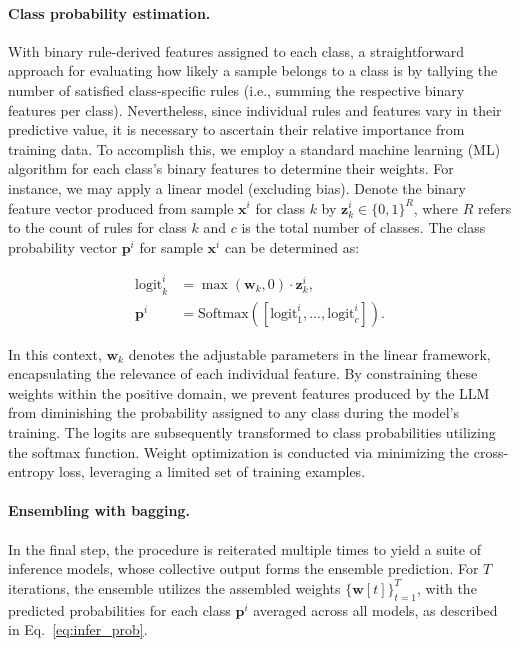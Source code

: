 \paragraph{Class probability estimation.} With binary rule-derived features assigned to each class, a straightforward approach for evaluating how likely a sample belongs to a class is by tallying the number of satisfied class-specific rules (i.e., summing the respective binary features per class). Nevertheless, since individual rules and features vary in their predictive value, it is necessary to ascertain their relative importance from training data. To accomplish this, we employ a standard machine learning (ML) algorithm for each class’s binary features to determine their weights. For instance, we may apply a linear model (excluding bias). Denote the binary feature vector produced from sample $\mathbf{x}^i$ for class $k$ by $\mathbf{z}_k^i \in \{0, 1\}^R$, where $R$ refers to the count of rules for class $k$ and $c$ is the total number of classes. The class probability vector $\mathbf{p}^i$ for sample $\mathbf{x}^i$ can be determined as:

\begin{align}
\text{logit}_k^i &= \max(\mathbf{w}_k, 0) \cdot \mathbf{z}_k^i, \nonumber \\
\mathbf{p}^i &= \text{Softmax}({[\text{logit}_{1}^i, ..., \text{logit}_{c}^i]}). \label{eq:infer_prob}
\end{align}

In this context, $\mathbf{w}_k$ denotes the adjustable parameters in the linear framework, encapsulating the relevance of each individual feature. By constraining these weights within the positive domain, we prevent features produced by the LLM from diminishing the probability assigned to any class during the model's training. The logits are subsequently transformed to class probabilities utilizing the softmax function. Weight optimization is conducted via minimizing the cross-entropy loss, leveraging a limited set of training examples.

\vspace*{-0.12in}
\paragraph{Ensembling with bagging.} In the final step, the procedure is reiterated multiple times to yield a suite of inference models, whose collective output forms the ensemble prediction. For $T$ iterations, the ensemble utilizes the assembled weights $\{\mathbf{w}[t]\}_{t=1}^T$, with the predicted probabilities for each class $\mathbf{p}^i$ averaged across all models, as described in Eq.~\ref{eq:infer_prob}.

